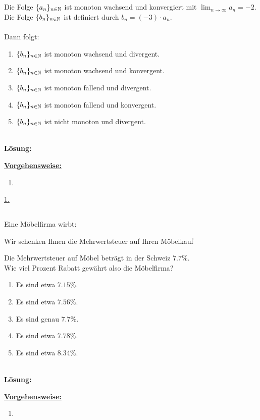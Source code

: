 \subsection*{}
Die Folge $ \lbrace a_n \rbrace_{n \in \mathbb{N}} $ ist monoton wachsend und konvergiert mit $ \lim_{n \to \infty} a_n = -2 $.
Die Folge $ \lbrace b_n \rbrace_{n \in \mathbb{N}} $ ist definiert durch $ b_n = (-3) \cdot a_n $.\\
\\
Dann folgt:
\renewcommand{\labelenumi}{(\alph{enumi})}
\begin{enumerate}
	\item $ \lbrace b_n \rbrace_{n \in \mathbb{N}} $ ist monoton wachsend und divergent.
	\item $ \lbrace b_n \rbrace_{n \in \mathbb{N}} $ ist monoton wachsend und konvergent.
	\item $ \lbrace b_n \rbrace_{n \in \mathbb{N}} $ ist monoton fallend und divergent.
	\item $ \lbrace b_n \rbrace_{n \in \mathbb{N}} $ ist monoton fallend und konvergent.
	\item $ \lbrace b_n \rbrace_{n \in \mathbb{N}} $ ist nicht monoton und divergent.
\end{enumerate}
\ \\
\textbf{Lösung:}
\begin{mdframed}
	\underline{\textbf{Vorgehensweise:}}
	\renewcommand{\labelenumi}{\theenumi.}
	\begin{enumerate}
		\item 
	\end{enumerate}
\end{mdframed}
\underline{1. }\\

 

\newpage
\subsection*{}
Eine Möbelfirma wirbt:
\begin{center}
	\glqq Wir schenken Ihnen die Mehrwertsteuer auf Ihren Möbelkauf\grqq
\end{center}
Die Mehrwertsteuer auf Möbel beträgt in der Schweiz $ 7.7 \% $.\\
Wie viel Prozent Rabatt gewährt also die Möbelfirma?
\renewcommand{\labelenumi}{(\alph{enumi})}
\begin{enumerate}
	\item 
	Es sind etwa $ 7.15 \% $.
	\item 
	Es sind etwa $ 7.56 \% $.
	\item 
	Es sind genau $ 7.7 \% $.
	\item
	Es sind etwa $ 7.78 \% $.
	\item
	Es sind etwa $ 8.34 \% $.
\end{enumerate}
\ \\
\textbf{Lösung:}
\begin{mdframed}
\underline{\textbf{Vorgehensweise:}}
\renewcommand{\labelenumi}{\theenumi.}
\begin{enumerate}
\item 
\end{enumerate}
\end{mdframed}

